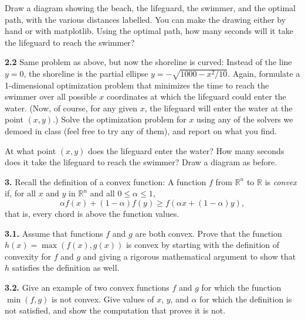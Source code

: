 \documentclass[11pt]{article}
\begin{document}
Draw a diagram showing the beach, the lifeguard, the swimmer, 
and the optimal path, with the various distances labelled. 
You can make the drawing either by hand or with matplotlib.
Using the optimal path, 
how many seconds will it take the lifeguard to reach the swimmer?

\par\medskip\noindent
{\bf 2.2}
Same problem as above, but now the shoreline is curved:
Instead of the line $y=0$, the shoreline is the partial ellipse
$y = -\sqrt{1000-x^2/10}$.
Again, formulate a 1-dimensional optimization problem that minimizes the 
time to reach the swimmer over all possible $x$ coordinates at which
the lifeguard could enter the water.
(Now, of course, for any given $x$, the lifeguard will enter the
water at the point $(x,y)$.)
Solve the optimization problem for $x$ using any of the solvers
we demoed in class (feel free to try any of them), 
and report on what you find.

At what point $(x,y)$ does the lifeguard enter the water?
How many seconds does it take the lifeguard to reach the swimmer?
Draw a diagram as before.

\par\bigskip\noindent
{\bf 3.}
Recall the definition of a convex function:
A function $f$ from $\mathbb{R}^n$ to $\mathbb{R}$ is {\em convex} if,
for all $x$ and $y$ in $\mathbb{R}^n$ and all $0\le\alpha\le 1$,
$$\alpha f(x) + (1-\alpha)f(y) \ge f(\alpha x + (1-\alpha)y),$$
that is, every chord is above the function values.

\par\medskip\noindent
{\bf 3.1.}
Assume that functions $f$ and $g$ are both convex.
Prove that the function $h(x)=\max(f(x),g(x))$ is convex
by starting with the definition of convexity for $f$ and $g$ 
and giving a rigorous mathematical argument to show that $h$
satisfies the definition as well.

\par\medskip\noindent
{\bf 3.2.}
Give an example of two convex functions $f$ and $g$ for which
the function $\min(f,g)$ is not convex.
Give values of $x$, $y$, and $\alpha$ for which the definition
is not satisfied, and show the computation that proves it is not.
\end{document}
